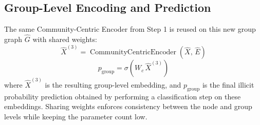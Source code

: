 \subsection{Group-Level Encoding and Prediction}
The same Community-Centric Encoder from Step 1 is reused on this new group graph $\hat{G}$ with shared weights:
\begin{equation}
  \hat{X}^{(3)} = \operatorname{CommunityCentricEncoder}\!\left(\hat{X},\, \hat{E}\right)
\end{equation}
\begin{equation}
  p_{\text{group}} = \sigma\!\left(W_c\, \hat{X}^{(3)}\right)
\end{equation}
where $\hat{X}^{(3)}$ is the resulting group-level embedding, and $p_{\text{group}}$ is the final illicit probability prediction obtained by performing a classification step on these embeddings. Sharing weights enforces consistency between the node and group levels while keeping the parameter count low.

